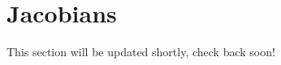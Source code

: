 \newpage
\section{Jacobians}\label{sec:jacobIndex}

This section will be updated shortly, check back soon!
